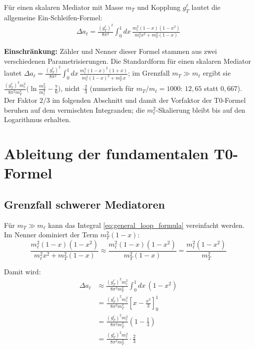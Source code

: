 	Für einen skalaren Mediator mit Masse $m_T$ und Kopplung $g_T^\ell$ lautet die allgemeine Ein-Schleifen-Formel:
	\begin{equation}
		\begin{split}
			\Delta a_\ell = \frac{(g_T^\ell)^2}{8\pi^2} \int_0^1 dx \, 
			\frac{m_\ell^2 (1-x)(1-x^2)}{m_\ell^2 x^2 + m_T^2 (1-x)}
		\end{split}
		\label{eq:general_loop_formula}
	\end{equation}
	
	\textbf{Einschränkung:} Zähler und Nenner dieser Formel stammen aus zwei verschiedenen Parametrisierungen. Die Standardform für einen skalaren Mediator lautet $\Delta a_\ell = \frac{(g_T^\ell)^2}{8\pi^2}\int_0^1 dx\,\frac{m_\ell^2(1-x)^2(1+x)}{m_\ell^2(1-x)^2 + m_T^2\,x}$; im Grenzfall $m_T \gg m_\ell$ ergibt sie $\frac{(g_T^\ell)^2 m_\ell^2}{8\pi^2 m_T^2}\bigl(\ln\frac{m_T^2}{m_\ell^2} - \frac76\bigr)$, nicht $\cdot\frac23$ (numerisch für $m_T/m_\ell = 1000$: $12{,}65$ statt $0{,}667$). Der Faktor $2/3$ im folgenden Abschnitt und damit der Vorfaktor der T0-Formel beruhen auf dem vermischten Integranden; die $m_\ell^2$-Skalierung bleibt bis auf den Logarithmus erhalten.
	
	\section{Ableitung der fundamentalen T0-Formel}
	
	\subsection{Grenzfall schwerer Mediatoren}
	
	Für $m_T \gg m_\ell$ kann das Integral \eqref{eq:general_loop_formula} vereinfacht werden. Im Nenner dominiert der Term $m_T^2 (1-x)$:
	\begin{equation}
		\frac{m_\ell^2 (1-x)(1-x^2)}{m_\ell^2 x^2 + m_T^2 (1-x)} 
		\approx \frac{m_\ell^2 (1-x)(1-x^2)}{m_T^2 (1-x)} 
		= \frac{m_\ell^2 (1-x^2)}{m_T^2}
		\label{eq:heavy_mediator_approx}
	\end{equation}
	
	Damit wird:
	\begin{equation}
		\begin{split}
			\Delta a_\ell &\approx \frac{(g_T^\ell)^2 m_\ell^2}{8\pi^2 m_T^2} \int_0^1 dx \, (1-x^2) \\
			&= \frac{(g_T^\ell)^2 m_\ell^2}{8\pi^2 m_T^2} \left[x - \frac{x^3}{3}\right]_0^1 \\
			&= \frac{(g_T^\ell)^2 m_\ell^2}{8\pi^2 m_T^2} \left(1 - \frac{1}{3}\right) \\
			&= \frac{(g_T^\ell)^2 m_\ell^2}{8\pi^2 m_T^2} \cdot \frac{2}{3}
		\end{split}
		\label{eq:integral_evaluation}
	\end{equation}
	
